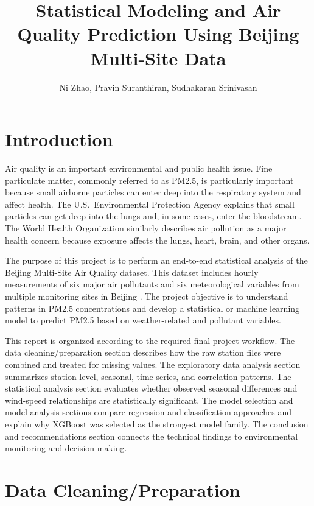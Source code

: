 \documentclass[stu,12pt,floatsintext]{apa7}
\title{Statistical Modeling and Air Quality Prediction Using Beijing Multi-Site Data}
\author{Ni Zhao, Pravin Suranthiran, Sudhakaran Srinivasan}
\affiliation{Shiley-Marcos School of Engineering \\ University of San Diego}
\begin{document}
\maketitle

\tableofcontents
\newpage

\section{Introduction}

Air quality is an important environmental and public health issue. Fine particulate
matter, commonly referred to as PM2.5, is particularly important because small airborne
particles can enter deep into the respiratory system and affect health. The
U.S.\ Environmental Protection Agency \parencite{EPA2026} explains that small particles
can get deep into the lungs and, in some cases, enter the bloodstream. The World Health
Organization \parencite{WHO_nd} similarly describes air pollution as a major health
concern because exposure affects the lungs, heart, brain, and other organs.

The purpose of this project is to perform an end-to-end statistical analysis of the
Beijing Multi-Site Air Quality dataset. This dataset includes hourly measurements of six
major air pollutants and six meteorological variables from multiple monitoring sites in
Beijing \parencite{Chen2017}. The project objective is to understand patterns in PM2.5
concentrations and develop a statistical or machine learning model to predict PM2.5 based
on weather-related and pollutant variables.

This report is organized according to the required final project workflow. The data
cleaning/preparation section describes how the raw station files were combined and treated
for missing values. The exploratory data analysis section summarizes station-level,
seasonal, time-series, and correlation patterns. The statistical analysis section
evaluates whether observed seasonal differences and wind-speed relationships are
statistically significant. The model selection and model analysis sections compare
regression and classification approaches and explain why XGBoost was selected as the
strongest model family. The conclusion and recommendations section connects the technical
findings to environmental monitoring and decision-making.

\section{Data Cleaning/Preparation}
\end{document}
